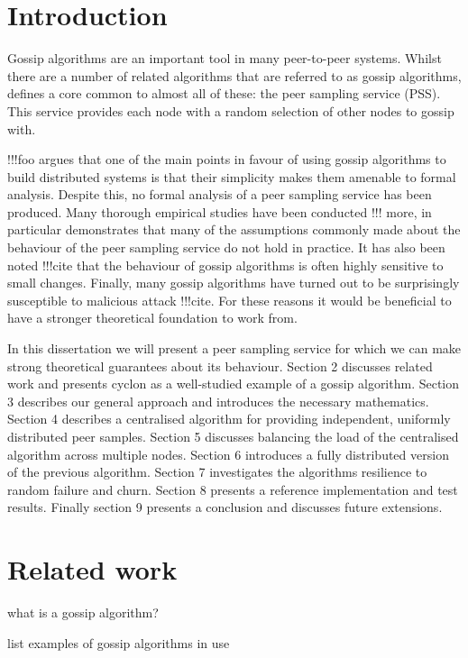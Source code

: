 \documentclass[a4paper,10pt]{article}
\date{2010-08-23}
\begin{document}
\section{Introduction}

Gossip algorithms are an important tool in many peer-to-peer systems. Whilst there are a number of related algorithms that are referred to as gossip algorithms, \cite{pss} defines a core common to almost all of these: the peer sampling service (PSS). This service provides each node with a random selection of other nodes to gossip with. 

!!!foo argues that one of the main points in favour of using gossip algorithms to build distributed systems is that their simplicity makes them amenable to formal analysis. Despite this, no formal analysis of a peer sampling service has been produced. Many thorough empirical studies have been conducted \cite{pss} !!! more, in particular \cite{pss} demonstrates that many of the assumptions commonly made about the behaviour of the peer sampling service do not hold in practice. It has also been noted !!!cite that the behaviour of gossip algorithms is often highly sensitive to small changes. Finally, many gossip algorithms have turned out to be surprisingly susceptible to malicious attack !!!cite. For these reasons it would be beneficial to have a stronger theoretical foundation to work from.

In this dissertation we will present a peer sampling service for which we can make strong theoretical guarantees about its behaviour. Section 2 discusses related work and presents cyclon as a well-studied example of a gossip algorithm. Section 3 describes our general approach and introduces the necessary mathematics. Section 4 describes a centralised algorithm for providing independent, uniformly distributed peer samples. Section 5 discusses balancing the load of the centralised algorithm across multiple nodes. Section 6 introduces a fully distributed version of the previous algorithm. Section 7 investigates the algorithms resilience to random failure and churn. Section 8 presents a reference implementation and test results. Finally section 9 presents a conclusion and discusses future extensions.

\section{Related work}

what is a gossip algorithm?

list examples of gossip algorithms in use
\end{document}
